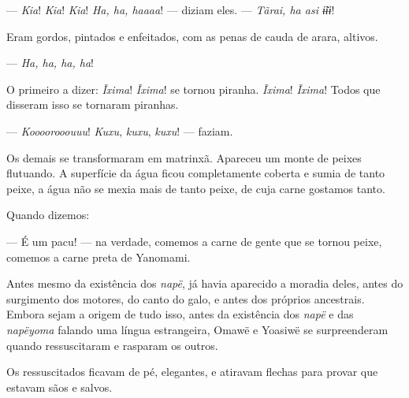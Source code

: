 

--- \textit{Kia}! \textit{Kia}! \textit{Kia}! \textit{Ha, ha, haaaa}! --- diziam eles. --- \textit{Tãrai, ha asi ɨ̃ɨɨ}! 

Eram gordos, pintados e enfeitados, com as penas de cauda de arara,
altivos.

--- \textit{Ha, ha, ha, ha}! 



O primeiro a dizer: \textit{Ĩxima}! \textit{Ĩxima}! se tornou piranha. \textit{Ĩxima}! \textit{Ĩxima}! Todos
que disseram isso se tornaram piranhas. 

--- \textit{Koooorooouuu}! \textit{Kuxu}, \textit{kuxu}, \textit{kuxu}! --- faziam. 

Os demais se transformaram em matrinxã. Apareceu um monte de peixes
flutuando. A superfície da água ficou completamente coberta e sumia de
tanto peixe, a água não se mexia mais de tanto peixe, de cuja carne gostamos
tanto.

Quando dizemos:

--- É um pacu! --- na verdade, comemos a carne de gente que se tornou
peixe, comemos a carne preta de Yanomami. 


Antes mesmo da existência dos \textit{napë}, já havia aparecido a moradia
deles, antes do surgimento dos motores, do canto do galo, e antes dos
próprios ancestrais. Embora sejam a origem de tudo isso, antes da
existência dos \textit{napë} e das \textit{napëyoma} falando uma língua
estrangeira, Omawë e Yoasiwë se surpreenderam quando ressuscitaram e
rasparam os outros. 

Os ressuscitados ficavam de pé, elegantes, e atiravam flechas para
provar que estavam sãos e salvos.

